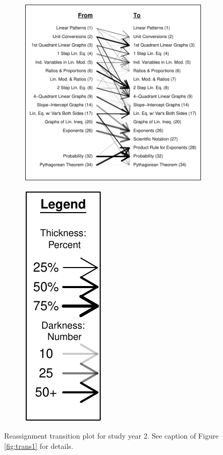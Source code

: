 \documentclass[12pt]{article}\usepackage[]{graphicx}\usepackage[]{color}
\makeatletter
\def\maxwidth{ %
  \ifdim\Gin@nat@width>\linewidth
    \linewidth
  \else
    \Gin@nat@width
  \fi
}
\makeatother
\begin{document}
\begin{figure}
  \centering
  \begin{subfigure}{5in}

\includegraphics[width=\maxwidth]{figure/transition2-1} 

\end{subfigure}
\begin{subfigure}{1in}

\includegraphics[width=\maxwidth]{figure/trans2legend-1} 

\end{subfigure}
\caption{Reassignment transition plot for study year 2. See caption of
Figure \ref{fig:trans1} for details.}
\label{fig:trans2}
\end{figure}
\end{document}
